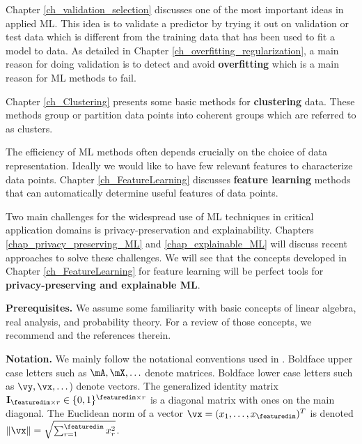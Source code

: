 \documentclass[12pt]{report}
\begin{document}
Chapter \ref{ch_validation_selection} discusses one of the most 
important ideas in applied ML. This idea is to validate a predictor 
by trying it out on validation or test data which is different from 
the training data that has been used to fit a model to data. As 
detailed in Chapter \ref{ch_overfitting_regularization}, a main 
reason for doing validation is to detect and avoid {\bf overfitting} 
which is a main reason for ML methods to fail. 

Chapter \ref{ch_Clustering} presents some basic methods for {\bf clustering} 
data. These methods group or partition data points into 
coherent groups which are referred to as clusters. 

The efficiency of ML methods often depends crucially on the choice 
of data representation. Ideally we would like to have few relevant 
features to characterize data points. Chapter \ref{ch_FeatureLearning} 
discusses {\bf feature learning} methods that can automatically 
determine useful features of data points. 

Two main challenges for the widespread use of ML techniques 
in critical application domains is privacy-preservation and 
explainability. Chapters \ref{chap_privacy_preserving_ML} 
and \ref{chap_explainable_ML} will discuss recent approaches 
to solve these challenges. We will see that the concepts 
developed in Chapter \ref{ch_FeatureLearning} for feature 
learning will be perfect tools for {\bf privacy-preserving and 
explainable ML}. 

{\bf Prerequisites.} We assume some familiarity with basic concepts 
of linear algebra, real analysis, and probability theory. For a review of 
those concepts, we recommend \cite[Chapter 2-4]{Goodfellow-et-al-2016} 
and the references therein. 

{\bf Notation.} We mainly follow the notational conventions used 
in \cite{Goodfellow-et-al-2016}. Boldface upper case letters such 
as $\mA,\mX,\ldots$ denote matrices. Boldface lower case letters 
such as $\vy,\vx,\ldots$) denote vectors. The generalized identity 
matrix $\mathbf{I}_{\featuredim \times r} \in \{0,1\}^{\featuredim \times r}$ 
is a diagonal matrix with ones on the main diagonal. The Euclidean 
norm of a vector $\vx=(x_{1},\ldots,x_{\featuredim})^{T}$ is denoted 
$\| \vx \| = \sqrt{ \sum_{r=1}^{\featuredim} x^{2}_{r}}$. 
\end{document}
